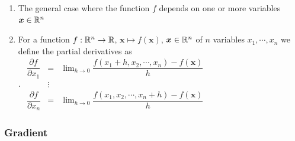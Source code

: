 \begin{enumerate}
    \item
    \begin{definition}
        The general case where the function $f$ depends on one or more variables $\bm{x} \in \mathbb{R}^n$
        \hfill \cite{mfml/book/mml/Deisenroth-Faisal-Ong}
    \end{definition}

    \item
    \begin{definition}
        For a function $f : \mathbb{R}^n \to \mathbb{R}$, $\bm{x} \mapsto f (\bm{x})$, $\bm{x} \in \mathbb{R}^n$ of $n$ variables $x_1, \cdots , x_n$ we define the partial derivatives as
        \hfill \cite{mfml/book/mml/Deisenroth-Faisal-Ong}
        \\
        .\hfill
        ${
            \displaystyle
            \begin{matrix}
                \dfrac{\partial f}{\partial x_1}
                &
                =
                &
                \lim_{h\to 0} \dfrac{f (x_1 + h, x_2, \cdots , x_n) - f (\bm{x})}{h}
                \\
                & \vdots &
                \\
                \dfrac{\partial f}{\partial x_n}
                &
                =
                &
                \lim_{h\to 0} \dfrac{f (x_1 , x_2, \cdots , x_n+ h) - f (\bm{x})}{h}
            \end{matrix}
        }$
        \hfill \cite{mfml/book/mml/Deisenroth-Faisal-Ong}
    \end{definition}
\end{enumerate}

\subsubsection{Gradient}

